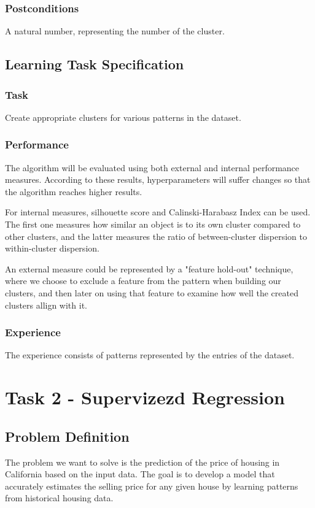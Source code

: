 \documentclass[a4paper, 11pt]{article}
\begin{document}
\subsubsection*{Postconditions} 
  A natural number, representing the number of the cluster.

\subsection{Learning Task Specification}

\subsubsection*{Task}
Create appropriate clusters for various patterns in the dataset.

\subsubsection*{Performance}
The algorithm will be evaluated using both external and internal
performance measures. According to these results, hyperparameters
will suffer changes so that the algorithm reaches higher results.

For internal measures, silhouette score and Calinski-Harabasz Index
can be used. The first one measures how similar an object is to its own cluster
compared to other clusters, and the latter measures the ratio
of between-cluster dispersion to within-cluster dispersion.

An external measure could be represented by a "feature hold-out" technique,
where we choose to exclude a feature from the pattern when building our clusters,
and then later on using that feature to examine how well the created clusters
allign with it.

\subsubsection*{Experience}
The experience consists of patterns represented by the entries
of the dataset.
\section{Task 2 - Supervizezd Regression}

\subsection*{Problem Definition}
The problem we want to solve is the prediction of the price of housing in California based on the input data. The goal is to develop a model that accurately estimates the selling price for any given house by learning patterns from historical housing data.
\end{document}
